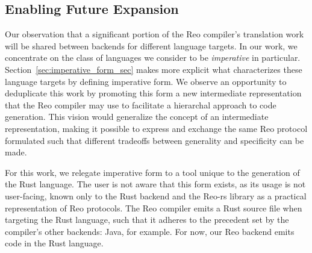 \subsection{Enabling Future Expansion}
Our observation that a significant portion of the Reo compiler's translation work will be shared between backends for different language targets. In our work, we concentrate on the class of languages we consider to be \textit{imperative} in particular. Section~\ref{sec:imperative_form_sec} makes more explicit what characterizes these language targets by defining imperative form. We observe an opportunity to deduplicate this work by promoting this form a new intermediate representation that the Reo compiler may use to facilitate a hierarchal approach to code generation. This vision would generalize the concept of an intermediate representation, making it possible to express and exchange the same Reo protocol formulated such that different tradeoffs between generality and specificity can be made. 

For this work, we relegate imperative form to a tool unique to the generation of the Rust language. The user is not aware that this form exists, as its usage is not user-facing, known only to the Rust backend and the Reo-rs library as a practical representation of Reo protocols. The Reo compiler emits a Rust source file when targeting the Rust language, such that it adheres to the precedent set by the compiler's other backends: Java, for example. For now, our Reo backend emits code in the Rust language. 


